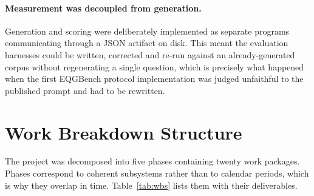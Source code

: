 \paragraph{Measurement was decoupled from generation.} Generation and scoring were
deliberately implemented as separate programs communicating through a JSON artifact
on disk. This meant the evaluation harnesses could be written, corrected and re-run
against an already-generated corpus without regenerating a single question, which
is precisely what happened when the first EQGBench protocol implementation was
judged unfaithful to the published prompt and had to be rewritten.

\section{Work Breakdown Structure}
\label{sec:plan-wbs}

The project was decomposed into five phases containing twenty work packages. Phases
correspond to coherent subsystems rather than to calendar periods, which is why they
overlap in time. Table~\ref{tab:wbs} lists them with their deliverables.

